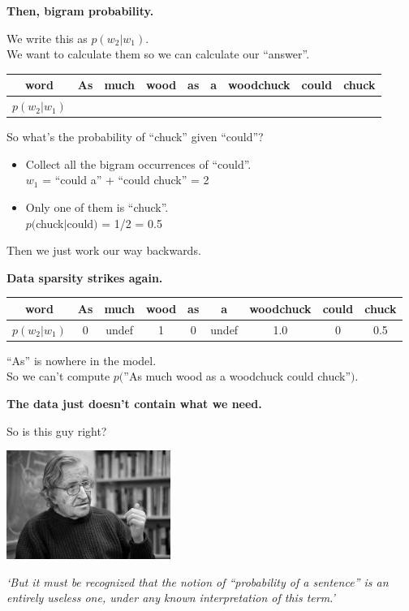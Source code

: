 \documentclass{beamer}
\newcommand{\pagestepalt}[2]{
  \begin{frame}[t]
    \begin{minipage}[t][0.26\textheight][t]{\textwidth}
      \begin{center}
        \huge
        \textbf{#1}
      \end{center}
    \end{minipage}
    
    \begin{minipage}[t][0.7\textheight][t]{\textwidth}
      #2
    \end{minipage}
  \end{frame}
}
\begin{document}
\pagestepalt{Then, bigram probability.}{
  We write this as \alert{$p(w_2|w_1)$}.\\
  We want to calculate them so we can calculate our ``answer''.
  \begin{center}
    \begin{tabular}{c|cccccccc}
      word & As & much & wood & as & a & woodchuck & could & \alert<2->{chuck}\\
      \hline
      $p(w_2|w_1)$ &&&&&&&& \only<6->{\alert{0.5}}\\
    \end{tabular}
  \end{center}\pause
  So what's the probability of ``chuck'' given ``could''?\pause
  \begin{itemize}
  \item Collect all the bigram occurrences of ``could''.\\ \pause $w_1$ \alert{= ``could a'' + ``could chuck'' = 2}\\\pause
  \item Only one of them is ``chuck''.\pause
    \\\alert{$p($chuck$|$could$)$ = 1/2 = 0.5}
  \end{itemize}\pause
  Then we just work our way backwards.
}

\pagestepalt{Data sparsity strikes again.}{
  \begin{center}
    \begin{tabular}{c|cccccccc}
      word & As & much & wood & as & a & woodchuck & could & chuck\\
      \hline
      $p(w_2|w_1)$ &\alert{0}&\alert{undef}&\alert{1} & \alert{0} & \alert{undef} & \alert{1.0} & \alert{0} & 0.5\\
    \end{tabular}
  \end{center}
  ``As'' is nowhere in the \alert{model}.\\
  So we can't compute
  $p($''As much wood as a woodchuck could chuck''$)$.
}

\pagestepalt{The data just doesn't contain what we need.}{
  So is this guy right?
  \begin{center}
    \includegraphics[width=0.4\textwidth]{images/noam-chomsky.jpg}

    {\it `But it must be recognized that the notion of ``probability of a sentence'' is an entirely useless one, under any known interpretation of this term.'}


  \end{center}
}
\end{document}
